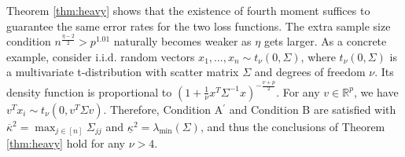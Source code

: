 Theorem \ref{thm:heavy} shows that the existence of fourth moment suffices to guarantee the same error rates for the two loss functions. The extra sample size condition $n^{\frac{\eta-2}{2}}>p^{1.01}$ naturally becomes weaker as $\eta$ gets larger. As a concrete example, consider i.i.d. random vectors $x_1,...,x_n\sim t_{\nu}(0,\Sigma)$, where $t_{\nu}(0,\Sigma)$ is a multivariate t-distribution with scatter matrix $\Sigma$ and degrees of freedom $\nu$. Its density function is proportional to $\left(1+\frac{1}{\nu}x^T\Sigma^{-1}x\right)^{-\frac{\nu+p}{2}}$. For any $v\in\mathbb{R}^p$, we have $v^Tx_i\sim t_{\nu}(0,v^T\Sigma v)$. Therefore, Condition A${}^\prime$ and Condition B are satisfied with $\overline{\kappa}^2=\max_{j\in[n]}\Sigma_{jj}$ and $\underline{\kappa}^2=\lambda_{\min}(\Sigma)$, and thus the conclusions of Theorem \ref{thm:heavy} hold for any $\nu>4$.
